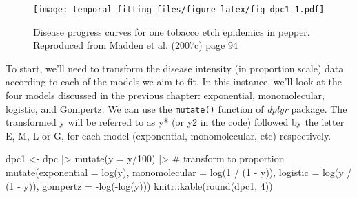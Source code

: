 \documentclass[
  letterpaper,
]{book}
\newenvironment{Shaded}{\begin{snugshade}}{\end{snugshade}}
\newcommand{\AttributeTok}[1]{\textcolor[rgb]{0.40,0.45,0.13}{#1}}
\newcommand{\CommentTok}[1]{\textcolor[rgb]{0.37,0.37,0.37}{#1}}
\newcommand{\DecValTok}[1]{\textcolor[rgb]{0.68,0.00,0.00}{#1}}
\newcommand{\FunctionTok}[1]{\textcolor[rgb]{0.28,0.35,0.67}{#1}}
\newcommand{\NormalTok}[1]{\textcolor[rgb]{0.00,0.23,0.31}{#1}}
\newcommand{\OtherTok}[1]{\textcolor[rgb]{0.00,0.23,0.31}{#1}}
\newcommand{\SpecialCharTok}[1]{\textcolor[rgb]{0.37,0.37,0.37}{#1}}
\begin{document}
\begin{figure}

{\centering \texttt{[image: temporal-fitting\_files/figure-latex/fig-dpc1-1.pdf]}

}

\caption{\label{fig-dpc1}Disease progress curves for one tobacco etch
epidemics in pepper. Reproduced from Madden et al. (2007c) page 94}

\end{figure}

To start, we'll need to transform the disease intensity (in proportion
scale) data according to each of the models we aim to fit. In this
instance, we'll look at the four models discussed in the previous
chapter: exponential, monomolecular, logistic, and Gompertz. We can use
the \texttt{mutate()} function of \emph{dplyr} package. The transformed
y will be referred to as y* (or y2 in the code) followed by the letter
E, M, L or G, for each model (exponential, monomolecular, etc)
respectively.

\begin{Shaded}
\begin{Highlighting}[]
\NormalTok{dpc1 }\OtherTok{\textless{}{-}}\NormalTok{ dpc }\SpecialCharTok{|\textgreater{}} 
  \FunctionTok{mutate}\NormalTok{(}\AttributeTok{y =}\NormalTok{ y}\SpecialCharTok{/}\DecValTok{100}\NormalTok{) }\SpecialCharTok{|\textgreater{}} \CommentTok{\# transform to proportion}
  \FunctionTok{mutate}\NormalTok{(}\AttributeTok{exponential =} \FunctionTok{log}\NormalTok{(y),}
         \AttributeTok{monomolecular =} \FunctionTok{log}\NormalTok{(}\DecValTok{1} \SpecialCharTok{/}\NormalTok{ (}\DecValTok{1} \SpecialCharTok{{-}}\NormalTok{ y)),}
         \AttributeTok{logistic =} \FunctionTok{log}\NormalTok{(y }\SpecialCharTok{/}\NormalTok{ (}\DecValTok{1} \SpecialCharTok{{-}}\NormalTok{ y)),}
         \AttributeTok{gompertz =} \SpecialCharTok{{-}}\FunctionTok{log}\NormalTok{(}\SpecialCharTok{{-}}\FunctionTok{log}\NormalTok{(y)))}
\NormalTok{knitr}\SpecialCharTok{::}\FunctionTok{kable}\NormalTok{(}\FunctionTok{round}\NormalTok{(dpc1, }\DecValTok{4}\NormalTok{)) }
\end{Highlighting}
\end{Shaded}
\end{document}
